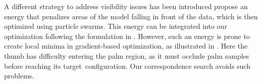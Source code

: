 




% 
 
A different strategy to address visibility issues has been introduced  propose an energy that penalizes areas of the model falling in front of the data, which is then optimized using particle swarms. This energy can be integrated into our optimization following the formulation in \cite[Eq. 15]{wei_siga12}. However, such an energy is prone to create local minima in gradient-based optimization, as illustrated in . Here the thumb has difficulty entering the palm region, as it must occlude palm samples before reaching its target~configuration. Our correspondence search avoids such problems.




